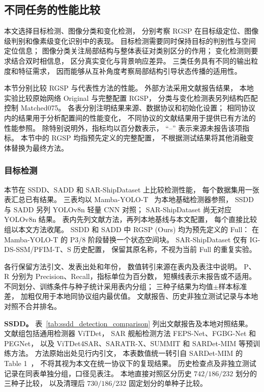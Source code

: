 \subsection{不同任务的性能比较}
\label{sec:performance_comparison}

本文选择目标检测、图像分类和变化检测，
分别考察 RGSP 在目标级定位、图像级判别和像素级变化识别中的表现。
目标检测需要同时保持目标的判别性与空间定位信息；
图像分类关注局部结构与整体表征对类别区分的作用；
变化检测则要求结合双时相信息，
区分真实变化与背景响应差异。
三类任务具有不同的输出粒度和特征需求，
因而能够从互补角度考察局部结构引导状态传播的适用性。

本节分别比较 RGSP 与代表性方法的性能。
外部方法采用文献报告结果，
本地实验比较原始网络 Original 与完整配置 RGSP，
分类与变化检测表另列结构匹配控制 Matched075。
各表分别注明结果来源、数据协议和初始化设置；
相同协议内的结果用于分析配置间的性能变化，
不同协议的文献结果用于提供已有方法的性能参照。
除特别说明外，指标均以百分数表示，
``--'' 表示来源未报告该项指标。
本节中的 RGSP 均指预先定义的完整配置，
不根据测试结果将其他消融变体替换为最终方法。

\subsubsection{目标检测}
\label{sec:detection_results}

本节在 SSDD、SADD 和 SAR-ShipDataset 上比较检测性能，
每个数据集用一张表汇总已有结果。
三表均以 Mamba-YOLO-T~\cite{mambayolo2024} 为本地基础检测器参照，
SSDD 与 SADD 另列 YOLOv8n 轻量 CNN 对照；
SAR-ShipDataset 尚无对应 YOLOv8n 结果。
表内先列文献方法，再列本地基线与本文配置，
每个直接比较组以本文方法收尾。
SSDD 和 SADD 中 RGSP (Ours) 均为预先定义的 Full：
在 Mamba-YOLO-T 的 P3/8 阶段替换一个状态空间块。
SAR-ShipDataset 仅有 IG-DS-SSM/PFIM-T、S 历史配置，
保留其原名称，不视为当前 Full 的重复实验。

各行保留方法引文、发表出处和年份，
数值转引来源在表内及表注中说明。
P、R 分别为 Precision、Recall，指标单位为百分数，
短横线表示未报告或不适用。
不同划分、训练条件与种子统计采用表内分组；
三种子结果为均值$\pm$样本标准差，
加粗仅用于本地同协议组内最优值。
文献报告、历史非独立测试记录与本地对照不合并排名。

\textbf{SSDD。}
表~\ref{tab:ssdd_detection_comparison}
列出文献报告及本地对照结果。
文献组包括通用检测器 ViTDet，
SAR 舰船检测方法 FEPS-Net、FGBG-Net 和 PEGNet，
以及 ViTDet4SAR、SARATR-X、SUMMIT 和 SARDet-MIM
等预训练方法。
方法原始出处见行内引文，
本表数值统一转引自 SARDet-MIM 的 Table 1~\cite{sardetmim2026}，
不将其视为本文在统一协议下的复现结果。
历史检查点及非独立测试记录在同表单独分组，口径见表注。
本地直接对照区分历史 $742/186/232$ 划分的三种子比较，
以及清理后 $730/186/232$ 固定划分的单种子比较。

